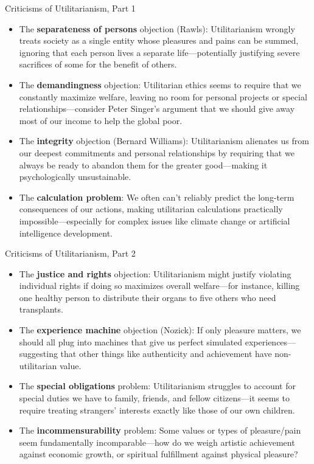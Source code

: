\documentclass[aspectratio=169]{beamer}
\begin{document}
\begin{frame}{Criticisms of Utilitarianism, Part 1}
    \begin{itemize}
        \item The \textbf{separateness of persons} objection (Rawls): Utilitarianism wrongly treats society as a single entity whose pleasures and pains can be summed, ignoring that each person lives a separate life—potentially justifying severe sacrifices of some for the benefit of others.
        
        \item The \textbf{demandingness} objection: Utilitarian ethics seems to require that we constantly maximize welfare, leaving no room for personal projects or special relationships—consider Peter Singer's argument that we should give away most of our income to help the global poor.
        
        \item The \textbf{integrity} objection (Bernard Williams): Utilitarianism alienates us from our deepest commitments and personal relationships by requiring that we always be ready to abandon them for the greater good—making it psychologically unsustainable.
        
        \item The \textbf{calculation problem}: We often can't reliably predict the long-term consequences of our actions, making utilitarian calculations practically impossible—especially for complex issues like climate change or artificial intelligence development.
    \end{itemize}
\end{frame}

\begin{frame}{Criticisms of Utilitarianism, Part 2}
    \begin{itemize}
        \item The \textbf{justice and rights} objection: Utilitarianism might justify violating individual rights if doing so maximizes overall welfare—for instance, killing one healthy person to distribute their organs to five others who need transplants.
        
        \item The \textbf{experience machine} objection (Nozick): If only pleasure matters, we should all plug into machines that give us perfect simulated experiences—suggesting that other things like authenticity and achievement have non-utilitarian value.
        
        \item The \textbf{special obligations} problem: Utilitarianism struggles to account for special duties we have to family, friends, and fellow citizens—it seems to require treating strangers' interests exactly like those of our own children.
        
        \item The \textbf{incommensurability} problem: Some values or types of pleasure/pain seem fundamentally incomparable—how do we weigh artistic achievement against economic growth, or spiritual fulfillment against physical pleasure?
    \end{itemize}
\end{frame}
\end{document}
